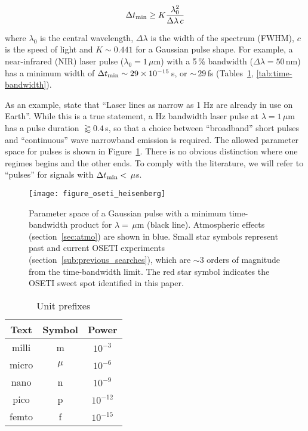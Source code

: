 \documentclass[twocolumn,tighten,longauthor]{myaastex62}
\begin{document}
\begin{equation}
\label{tmin}
\Delta t_{\rm min} \geq K \frac{\lambda_0^2}{\Delta \lambda\,c}
\end{equation}

where $\lambda_0$ is the central wavelength, $\Delta \lambda$ is the width of the spectrum (FWHM), $c$ is the speed of light and $K\sim0.441$ for a Gaussian pulse shape. For example, a near-infrared (NIR) laser pulse ($\lambda_0=1\,\mu$m) with a 5\,\% bandwidth ($\Delta \lambda=50\,$nm) has a minimum width of $\Delta t_{\rm min} \sim 29\times10^{-15}\,$s, or $\sim\,29\,$fs (Tables~\ref{tab:prefixes}, \ref{tab:time-bandwidth}).

As an example, \citet{2017AJ....153..251T} state that ``Laser lines as narrow as 1 Hz are already in use on Earth''. While this is a true statement, a Hz bandwidth laser pulse at $\lambda=1\,\mu$m has a pulse duration $\gtrapprox 0.4\,$s, so that a choice between ``broadband'' short pulses and ``continuous'' wave narrowband emission is required. The allowed parameter space for pulses is shown in Figure~\ref{fig:oseti_heisenberg}. There is no obvious distinction where one regimes begins and the other ends. To comply with the literature, we will refer to ``pulses'' for signals with $\Delta t_{\rm min}<\,\mu$s.


\begin{figure}
\texttt{[image: figure\_oseti\_heisenberg]}
\caption{\label{fig:oseti_heisenberg}Parameter space of a Gaussian pulse with a minimum time-bandwidth product for $\lambda=\,\mu$m (black line). Atmospheric effects (section~\ref{sec:atmo}) are shown in blue. Small star symbols represent past and current OSETI experiments (section~\ref{sub:previous_searches}), which are $\sim3$ orders of magnitude from the time-bandwidth limit. The red star symbol indicates the OSETI sweet spot identified in this paper.}
\end{figure}


\begin{table}
\center
\caption{Unit prefixes}
\label{tab:prefixes}
\begin{tabular}{ccc}
\hline
Text  & Symbol & Power     \\
\hline
milli & m     & $10^{-3}$  \\
micro & $\mu$ & $10^{-6}$  \\
nano  & n     & $10^{-9}$  \\
pico  & p     & $10^{-12}$ \\
femto & f     & $10^{-15}$ \\
\hline
\end{tabular}
\end{table}
\end{document}
